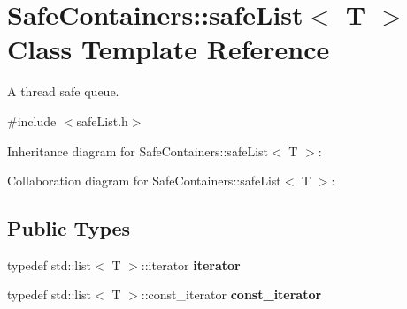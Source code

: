 \hypertarget{classSafeContainers_1_1safeList}{}\section{Safe\+Containers\+::safe\+List$<$ T $>$ Class Template Reference}
\label{classSafeContainers_1_1safeList}


A thread safe queue.  




{\ttfamily \#include $<$safe\+List.\+h$>$}



Inheritance diagram for Safe\+Containers\+::safe\+List$<$ T $>$\+:


Collaboration diagram for Safe\+Containers\+::safe\+List$<$ T $>$\+:
\subsection*{Public Types}
\begin{DoxyCompactItemize}
\item 
\mbox{\label{classSafeContainers_1_1safeList_ac5c9cb951014e13f0a83e8f4f7d7f5ae}} 
typedef std\+::list$<$ T $>$\+::iterator {\bfseries iterator}
\item 
\mbox{\label{classSafeContainers_1_1safeList_aa341a97abaf143b3a8cb314d4a067ca8}} 
typedef std\+::list$<$ T $>$\+::const\+\_\+iterator {\bfseries const\+\_\+iterator}
\end{DoxyCompactItemize}
